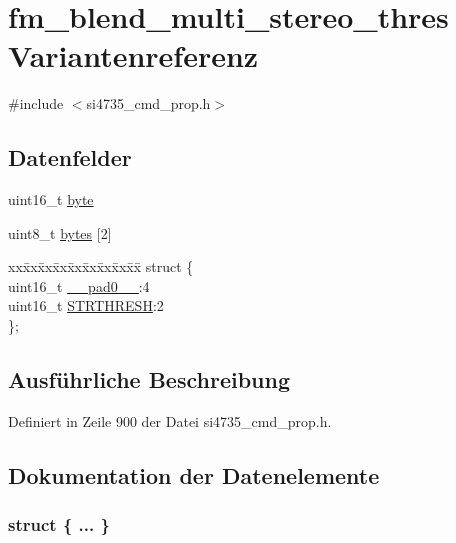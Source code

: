 \hypertarget{unionfm__blend__multi__stereo__thres}{}\section{fm\+\_\+blend\+\_\+multi\+\_\+stereo\+\_\+thres Variantenreferenz}
\label{unionfm__blend__multi__stereo__thres}


{\ttfamily \#include $<$si4735\+\_\+cmd\+\_\+prop.\+h$>$}

\subsection*{Datenfelder}
\begin{DoxyCompactItemize}
\item 
uint16\+\_\+t \hyperlink{unionfm__blend__multi__stereo__thres_ab0549c1b5ea980a02e7eab77e21fea49}{byte}
\item 
uint8\+\_\+t \hyperlink{unionfm__blend__multi__stereo__thres_a46e4c05d20a047ec169f60d3167e912e}{bytes} \mbox{[}2\mbox{]}
\item 
\begin{tabbing}
xx\=xx\=xx\=xx\=xx\=xx\=xx\=xx\=xx\=\kill
struct \{\\
\>uint16\_t \hyperlink{unionfm__blend__multi__stereo__thres_a77132c2c26a75f5b8751b235cda23828}{\_\_pad0\_\_}:4\\
\>uint16\_t \hyperlink{unionfm__blend__multi__stereo__thres_ae59cc6ed2c20ceb75c5065984e1751d1}{STRTHRESH}:2\\
\}; \\

\end{tabbing}\end{DoxyCompactItemize}


\subsection{Ausführliche Beschreibung}


Definiert in Zeile 900 der Datei si4735\+\_\+cmd\+\_\+prop.\+h.



\subsection{Dokumentation der Datenelemente}
\hypertarget{unionfm__blend__multi__stereo__thres_a153951451b819d749ffc49a8875d8b9a}{}\subsubsection[{"@111}]{\setlength{\rightskip}{0pt plus 5cm}struct \{ ... \} }\label{unionfm__blend__multi__stereo__thres_a153951451b819d749ffc49a8875d8b9a}
\hypertarget{unionfm__blend__multi__stereo__thres_a77132c2c26a75f5b8751b235cda23828}{}
